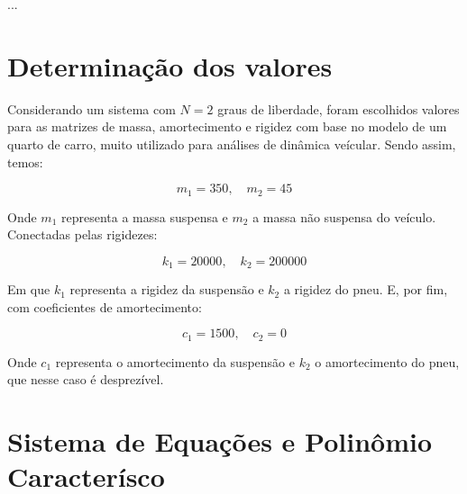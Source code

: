 \documentclass[12pt,a4paper]{article}
\begin{document}
...

\section{Determinação dos valores}


Considerando um sistema com $N = 2$ graus de liberdade, foram escolhidos valores para as matrizes de massa, amortecimento e rigidez com base no modelo de um quarto de carro, muito utilizado para análises de dinâmica veícular. Sendo assim, temos:

\begin{equation}
    m_1 = 350, \quad m_2 = 45
\end{equation}

\noindent Onde $m_1$ representa a massa suspensa e $m_2$ a massa não suspensa do veículo. Conectadas pelas rigidezes:

\begin{equation}
    k_1 = 20000, \quad k_2 = 200000
\end{equation}

\noindent Em que $k_1$ representa a rigidez da suspensão e $k_2$ a rigidez do pneu. E, por fim, com coeficientes de amortecimento:

\begin{equation}
    c_1 = 1500, \quad c_2 = 0
\end{equation}

\noindent Onde $c_1$ representa o amortecimento da suspensão e $k_2$ o amortecimento do pneu, que nesse caso é desprezível.


\section{Sistema de Equações e Polinômio Caracterísco}
\end{document}
